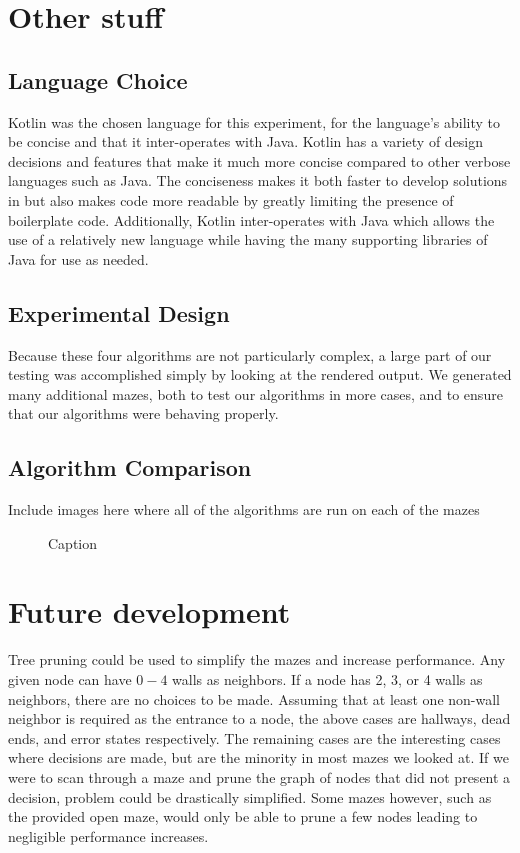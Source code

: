 \documentclass{article}
\begin{document}

\section{Other stuff} %
\subsection{Language Choice}
Kotlin was the chosen language for this experiment, for the language's ability to be concise and that it inter-operates with Java. Kotlin has a variety of design decisions and features that make it much more concise compared to other verbose languages such as Java. The conciseness makes it both faster to develop solutions in but also makes code more readable by greatly limiting the presence of boilerplate code. Additionally, Kotlin inter-operates with Java which allows the use of a relatively new language while having the many supporting libraries of Java for use as needed.
\subsection{Experimental Design}

Because these four algorithms are not particularly complex, a large part of our testing was accomplished simply by looking at the rendered output. We generated many additional mazes, both to test our algorithms in more cases, and to ensure that our algorithms were behaving properly.

\subsection{Algorithm Comparison}
Include images here where all of the algorithms are run on each of the mazes

\begin{figure}
	\centering
	\caption{Caption}
	\label{fig:algorithm_comp}
\end{figure}

\section{Future development}
Tree pruning could be used to simplify the mazes and increase performance. Any given node can have $0-4$ walls as neighbors. If a node has 2, 3, or 4 walls as neighbors, there are no choices to be made. Assuming that at least one non-wall neighbor is  required as the entrance to a node, the above cases are hallways, dead ends, and error states respectively. The remaining cases are the interesting cases where decisions are made, but are the minority in most mazes we looked at. If we were to scan through a maze and prune the graph of nodes that did not present a decision, problem could be drastically simplified. Some mazes however, such as the provided open maze, would only be able to prune a few nodes leading to negligible performance increases.
\end{document}
